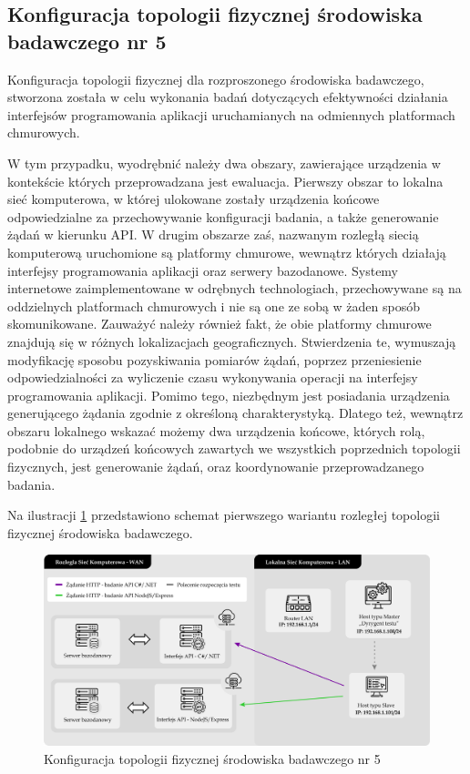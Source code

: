 \subsection*{Konfiguracja topologii fizycznej środowiska badawczego nr 5}
\label{sec:rozproszone-srodowisko-badawcze-ver-1}
Konfiguracja topologii fizycznej dla rozproszonego środowiska badawczego, stworzona została w celu wykonania badań dotyczących efektywności działania interfejsów programowania aplikacji uruchamianych na odmiennych platformach chmurowych.

W tym przypadku, wyodrębnić należy dwa obszary, zawierające urządzenia w kontekście których przeprowadzana jest ewaluacja. Pierwszy obszar to lokalna sieć komputerowa, w której ulokowane zostały urządzenia końcowe odpowiedzialne za przechowywanie konfiguracji badania, a także generowanie żądań w kierunku API. W drugim obszarze zaś, nazwanym rozległą siecią komputerową uruchomione są platformy chmurowe, wewnątrz których działają interfejsy programowania aplikacji oraz serwery bazodanowe. Systemy internetowe zaimplementowane w odrębnych technologiach, przechowywane są na oddzielnych platformach chmurowych i nie są one ze sobą w żaden sposób skomunikowane. Zauważyć należy również fakt, że obie platformy chmurowe znajdują się w różnych lokalizacjach geograficznych. Stwierdzenia te, wymuszają modyfikację sposobu pozyskiwania pomiarów żądań, poprzez przeniesienie odpowiedzialności za wyliczenie czasu wykonywania operacji na interfejsy programowania aplikacji. Pomimo tego, niezbędnym jest posiadania urządzenia generującego żądania zgodnie z określoną charakterystyką. Dlatego też, wewnątrz obszaru lokalnego wskazać możemy dwa urządzenia końcowe, których rolą, podobnie do urządzeń końcowych zawartych we wszystkich poprzednich topologii fizycznych, jest generowanie żądań, oraz koordynowanie przeprowadzanego badania.

Na ilustracji \ref{fig:topologia-4} przedstawiono schemat pierwszego wariantu rozległej topologii fizycznej środowiska badawczego.

\clearpage

\begin{figure}[ht]
    \centering
     \includegraphics[width=\linewidth]{rys04/topologia-4.png}
    \caption{Konfiguracja topologii fizycznej środowiska badawczego nr 5}
    \label{fig:topologia-4}
\end{figure}


